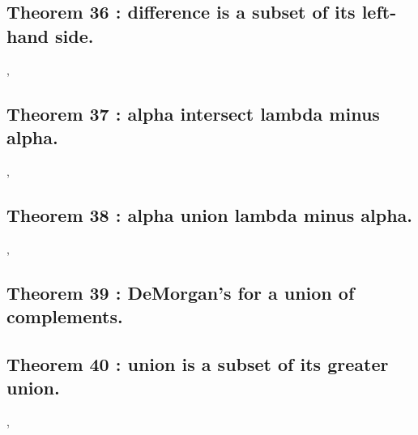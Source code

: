 \documentclass[preview]{standalone}
\begin{document}
\subsection[Set difference is a subset of its left-hand side.]
    {
        \color{section}Theorem 36 \color{black} : difference is a subset of its left-hand side.
    }

\sep


\subsection[Alpha intersect lambda minus alpha is empty.]
    {
        \color{section}Theorem 37 \color{black} : alpha intersect lambda minus alpha.
    }

\sep
\pagebreak


\subsection[Alpha union lambda minus alpha.]
    {
        \color{section}Theorem 38 \color{black} : alpha union lambda minus alpha.
    }

\sep


\subsection[DeMorgan's law for a union of complements.]
    {
        \color{section}Theorem 39 \color{black} : DeMorgan's for a union of complements.
    }

\pagebreak


\subsection[Union is a subset of its greater union.]
    {
        \color{section}Theorem 40 \color{black} : union is a subset of its greater union.
    }

\sep


\end{document}
